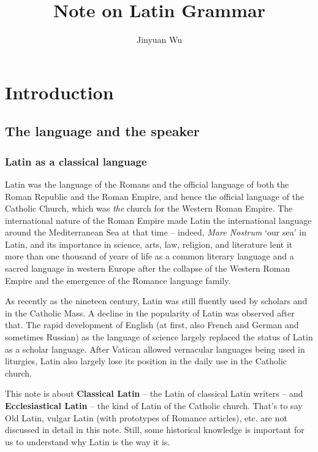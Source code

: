 \documentclass[a4paper, oneside]{report}
\title{Note on Latin Grammar}
\author{Jinyuan Wu}
\newcommand*{\concept}[1]{\textbf{#1}}
\newcommand{\form}[1]{\emph{#1}}
\newcommand{\translate}[1]{`#1'}
\begin{document}
\automath

\maketitle

\chapter{Introduction}

\section{The language and the speaker}

\subsection{Latin as a classical language}

Latin was the language of the Romans
and the official language of both the Roman Republic and the Roman Empire,
and hence the official language of the Catholic Church, 
which was \emph{the} church for the Western Roman Empire. 
The international nature of the Roman Empire made Latin 
the international language around the Mediterranean Sea at that time -- 
indeed, \form{Mare Nostrum} \translate{our sea} in Latin,
and its importance in science, arts, law, religion, and literature 
lent it more than one thousand of years of life 
as a common literary language and a sacred language in western Europe
after the collapse of the Western Roman Empire 
and the emergence of the Romance language family.

As recently as the nineteen century,
Latin was still fluently used by scholars and in the Catholic Mass. 
A decline in the popularity of Latin was observed after that.
The rapid development of English (at first, also French and German and sometimes Russian)
as the language of science 
largely replaced the status of Latin as a scholar language.
After Vatican allowed vernacular languages being used in liturgies, 
Latin also largely lose its position in the daily use in the Catholic church. 

This note is about \concept{Classical Latin} -- the Latin of classical Latin writers -- 
and \concept{Ecclesiastical Latin} -- the kind of Latin of the Catholic church.
That's to say Old Latin, vulgar Latin (with prototypes of Romance articles), etc.
are not discussed in detail in this note.
Still, some historical knowledge is important for us to understand 
why Latin is the way it is. 
\end{document}
